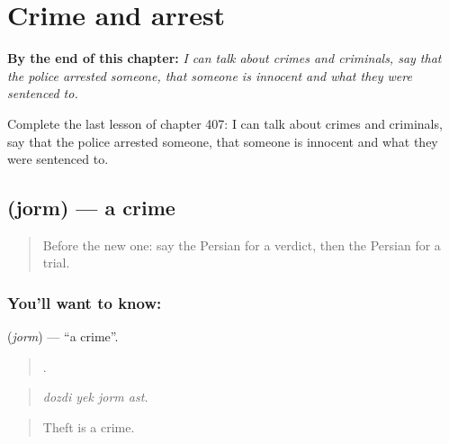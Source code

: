 
\chapter{Crime and arrest}
\label{ch:fa-crime-and-arrest}

\begin{chapteropening}
\textbf{By the end of this chapter:} \emph{I can talk about crimes and criminals, say that the police arrested someone, that someone is innocent and what they were sentenced to.}

Complete the last lesson of chapter 407: I can talk about crimes and criminals, say that the police arrested someone, that someone is innocent and what they were sentenced to.
\end{chapteropening}

\section[\texorpdfstring{\fa{جرم} (jorm)}{جرم (jorm)}]{ (jorm) — a crime}

\label{lesson:FA-C407-jorm}



\begin{quote}
Before the new one: say the Persian for a verdict, then the Persian for a trial.
\end{quote}

\subsection*{You'll want to know: }
\textbf{} (\emph{jorm}) — \textquotedblleft{}a crime\textquotedblright{}.

\begin{quote}
   .
\end{quote}

\begin{quote}
\emph{dozdi yek jorm ast.}
\end{quote}

\begin{quote}
Theft is a crime.
\end{quote}

